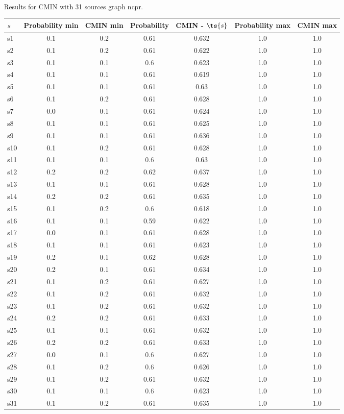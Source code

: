 \documentclass{article}
\begin{document}
\noindent Results for CMIN with 31 sources graph ncpr.

\noindent\begin{tabular}{|l|c|c|c|c|c|c|}
\hline
$s$& Probability min & CMIN min & Probability & CMIN - $\ts{s}$ & Probability max & CMIN max\\
\hline
s1 &0.1 & 0.2 & 0.61 & 0.632 & 1.0 & 1.0\\
\hline
s2 &0.1 & 0.2 & 0.61 & 0.622 & 1.0 & 1.0\\
\hline
s3 &0.1 & 0.1 & 0.6 & 0.623 & 1.0 & 1.0\\
\hline
s4 &0.1 & 0.1 & 0.61 & 0.619 & 1.0 & 1.0\\
\hline
s5 &0.1 & 0.1 & 0.61 & 0.63 & 1.0 & 1.0\\
\hline
s6 &0.1 & 0.2 & 0.61 & 0.628 & 1.0 & 1.0\\
\hline
s7 &0.0 & 0.1 & 0.61 & 0.624 & 1.0 & 1.0\\
\hline
s8 &0.1 & 0.1 & 0.61 & 0.625 & 1.0 & 1.0\\
\hline
s9 &0.1 & 0.1 & 0.61 & 0.636 & 1.0 & 1.0\\
\hline
s10 &0.1 & 0.2 & 0.61 & 0.628 & 1.0 & 1.0\\
\hline
s11 &0.1 & 0.1 & 0.6 & 0.63 & 1.0 & 1.0\\
\hline
s12 &0.2 & 0.2 & 0.62 & 0.637 & 1.0 & 1.0\\
\hline
s13 &0.1 & 0.1 & 0.61 & 0.628 & 1.0 & 1.0\\
\hline
s14 &0.2 & 0.2 & 0.61 & 0.635 & 1.0 & 1.0\\
\hline
s15 &0.1 & 0.2 & 0.6 & 0.618 & 1.0 & 1.0\\
\hline
s16 &0.1 & 0.1 & 0.59 & 0.622 & 1.0 & 1.0\\
\hline
s17 &0.0 & 0.1 & 0.61 & 0.628 & 1.0 & 1.0\\
\hline
s18 &0.1 & 0.1 & 0.61 & 0.623 & 1.0 & 1.0\\
\hline
s19 &0.2 & 0.1 & 0.62 & 0.628 & 1.0 & 1.0\\
\hline
s20 &0.2 & 0.1 & 0.61 & 0.634 & 1.0 & 1.0\\
\hline
s21 &0.1 & 0.2 & 0.61 & 0.627 & 1.0 & 1.0\\
\hline
s22 &0.1 & 0.2 & 0.61 & 0.632 & 1.0 & 1.0\\
\hline
s23 &0.1 & 0.2 & 0.61 & 0.632 & 1.0 & 1.0\\
\hline
s24 &0.2 & 0.2 & 0.61 & 0.633 & 1.0 & 1.0\\
\hline
s25 &0.1 & 0.1 & 0.61 & 0.632 & 1.0 & 1.0\\
\hline
s26 &0.2 & 0.2 & 0.61 & 0.633 & 1.0 & 1.0\\
\hline
s27 &0.0 & 0.1 & 0.6 & 0.627 & 1.0 & 1.0\\
\hline
s28 &0.1 & 0.2 & 0.6 & 0.626 & 1.0 & 1.0\\
\hline
s29 &0.1 & 0.2 & 0.61 & 0.632 & 1.0 & 1.0\\
\hline
s30 &0.1 & 0.1 & 0.6 & 0.623 & 1.0 & 1.0\\
\hline
s31 &0.1 & 0.2 & 0.61 & 0.635 & 1.0 & 1.0\\
\hline
\end{tabular}\\
\end{document}
